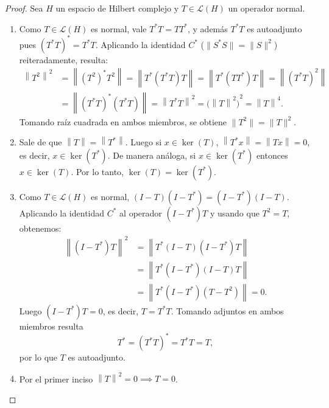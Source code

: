 \documentclass{article}
\theoremstyle{definition}
\newcommand{\norm}[1]{\left\lVert #1 \right\rVert}       %
\newcommand{\LH}{\mathcal{L}(H)}                         %
\newcommand{\Ker}{\operatorname{ker}}                    %
\begin{document}
\begin{proof}
	Sea \( H \) un espacio de Hilbert complejo y \( T \in \LH \) un operador normal.
	\begin{enumerate}
		\item Como \( T \in \LH \) es normal, vale \(T^*T = TT^*\), y además \(T^*T\) es autoadjunto pues \({(T^*T)}^* = T^*T\). Aplicando la identidad \(C^*\) (\( \|S^*S\| = \|S\|^2\)) reiteradamente, resulta:
		      \begin{align*}
			      \norm{T^2}^2 & = \norm{{(T^2)}^* T^2} = \norm{T^* (T^* T) T} = \norm{T^* (T T^*) T} = \norm{{(T^* T)}^2} \\
			                   & = \norm{{(T^* T)}^* (T^* T)} = \norm{T^* T}^2 = {\bigl(\norm{T}^2\bigr)}^2 = \norm{T}^4.
		      \end{align*}
		      Tomando raíz cuadrada en ambos miembros, se obtiene \( \|T^2\| = \|T\|^2\).
		\item Sale de que \( \norm{T} = \norm{T^*} \). Luego si \( x \in \Ker(T) \), \( \norm{T^* x} = \norm{T x} = 0 \), es decir, \( x \in \Ker(T^*) \). De manera análoga, si \( x \in \Ker(T^*) \) entonces \( x \in \Ker(T) \). Por lo tanto, \( \Ker(T) = \Ker(T^*) \).
		\item Como \(T \in \LH \) es normal, \((I - T)(I - T^*) = (I - T^*)(I - T)\). Aplicando la identidad \(C^*\) al operador \((I - T^*)T\) y usando que \(T^2 = T\), obtenemos:
		      \begin{align*}
			      \norm{(I - T^*)T}^2 & = \norm{T^*(I - T)(I - T^*)T}       \\
			                          & = \norm{T^*(I - T^*)(I - T)T}       \\
			                          & = \norm{T^*(I - T^*)(T - T^2)} = 0.
		      \end{align*}
		      Luego \((I - T^*)T = 0\), es decir, \(T = T^*T\). Tomando adjuntos en ambos miembros resulta
		      \[
			      T^* = {(T^*T)}^* = T^*T = T,
		      \]
		      por lo que \(T\) es autoadjunto.
		\item Por el primer inciso \( \norm{T}^2 = 0 \implies T = 0 \).
	\end{enumerate}
\end{proof}

\vspace{0.5cm}
\end{document}
